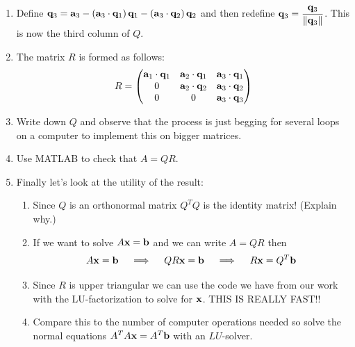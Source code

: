 \begin{problem}
\begin{enumerate}
        \item Define ${\bf q}_3 = \displaystyle {\bf a}_3 - \left( {\bf a}_3 \cdot {\bf q}_1 \right){\bf q}_1
            - \left( {\bf a}_3 \cdot {\bf q}_2 \right){\bf q}_2$ and then redefine $\displaystyle
            {\bf q}_3 = \frac{{\bf q}_3}{\|{\bf q}_3\|}$.  This is now the third column of
            $Q$.\\
        \item The matrix $R$ is formed as follows:
            \[ R = \begin{pmatrix} {\bf a}_1 \cdot {\bf q}_1 & {\bf a}_2 \cdot {\bf q}_1 & {\bf a}_3 \cdot
                    {\bf q}_1 \\ 0 & {\bf a}_2 \cdot {\bf q}_2 & {\bf a}_3 \cdot {\bf q}_2 \\ 0 & 0 & {\bf a}_3
                    \cdot {\bf q}_3 \end{pmatrix} \]
        \item Write down $Q$ and observe that the process is just begging for several
            loops on a computer to implement this on bigger matrices.
        \item Use MATLAB to check that $A = QR$.
        \item Finally let's look at the utility of the result:
            \begin{enumerate}
                \item Since $Q$ is an orthonormal matrix $Q^TQ$ is the identity matrix!
                    (Explain why.)
                \item If we want to solve $A{\bf x} = {\bf b}$ and we can write $A = QR$ then 
                    \[ A {\bf x} = {\bf b} \quad \implies \quad QR {\bf x} = {\bf b} \quad \implies \quad
                        R {\bf x} = Q^T {\bf b} \]
                \item Since $R$ is upper triangular we can use the  code we
                    have from our work with the LU-factorization to solve for ${\bf x}$.  THIS
                    IS REALLY FAST!!
                \item Compare this to the number of computer operations needed so solve
                    the normal equations $A^TA{\bf x} = A^T {\bf b}$ with an $LU$-solver.
            \end{enumerate}
    \end{enumerate}
\end{problem}

